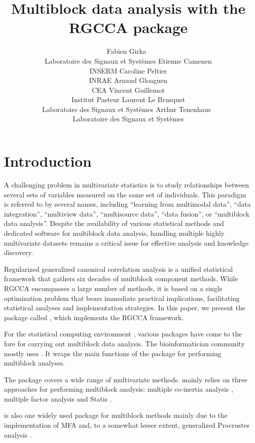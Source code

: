\documentclass[
]{jss}
\author{
Fabien Girka~\orcidlink{0000-0003-2843-1104}\\Laboratoire des Signaux et
Systèmes \And Etienne Camenen\\INSERM \And Caroline Peltier\\INRAE
\AND Arnaud Gloaguen\\CEA \And Vincent Guillemot\\Institut Pasteur
\AND Laurent Le Brusquet\\Laboratoire des Signaux et
Systèmes \And Arthur
Tenenhaus~\orcidlink{0000-0003-3459-1518}\\Laboratoire des Signaux et
Systèmes
}
\title{Multiblock data analysis with the RGCCA package}
\begin{document}
\newtheorem{theorem}{theorem}[section]%
\newtheorem{lemma}[theorem]{Lemma}
\newtheorem{proposition}[theorem]{Proposition}
\newtheorem{corollary}[theorem]{Corollary}
\newtheorem{remark}[theorem]{Remark}

\section{Introduction}\label{introduction}

A challenging problem in multivariate statistics is to study
relationships between several sets of variables measured on the same set
of individuals. This paradigm is referred to by several names, including
``learning from multimodal data'', ``data integration'', ``multiview
data'', ``multisource data'', ``data fusion'', or ``multiblock data
analysis''. Despite the availability of various statistical methods and
dedicated software for multiblock data analysis, handling multiple
highly multivariate datasets remains a critical issue for effective
analysis and knowledge discovery.

Regularized generalized canonical correlation analysis
\citep[RGCCA,][]{Tenenhaus2011, Tenenhaus2014, Tenenhaus2015, Tenenhaus2017}
is a unified statistical framework that gathers six decades of
multiblock component methods. While RGCCA encompasses a large number of
methods, it is based on a single optimization problem that bears
immediate practical implications, facilitating statistical analyses and
implementation strategies. In this paper, we present the 
package called , which implements the RGCCA framework.

For the statistical computing environment  \citep{R2022},
various  packages have come to the fore for carrying out
multiblock data analysis. The bioinformatician community mostly uses
 \citep{Rohart2017}. It wraps the main functions of the
 package for performing multiblock analyses.

The  package \citep{Dray2007} covers a wide range of
multivariate methods.  mainly relies on three approaches for
performing multiblock analysis: multiple co-inertia analysis
\citep[MCOA, ][]{Chessel1996}, multiple factor analysis
\citep[MFA,][]{Escofier1994} and Statis \citep{Lavit1994}.

 \citep{Le2008} is also one widely used package for
multiblock methods mainly due to the implementation of MFA and, to a
somewhat lesser extent, generalized Procrustes analysis
\citep[GPA,][]{Gower1975}.
\end{document}

